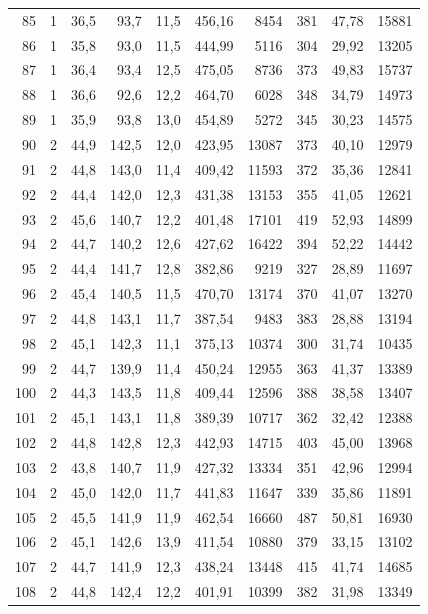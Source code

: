 \documentclass[11pt,a4paper]{article}
\begin{document}
{\begin{longtable}{r c r r r r r r r r}
85 & 1 & 36,5 & 93,7 & 11,5 & 456,16 & 8454 & 381 & 47,78 & 15881 \\
86 & 1 & 35,8 & 93,0 & 11,5 & 444,99 & 5116 & 304 & 29,92 & 13205 \\
87 & 1 & 36,4 & 93,4 & 12,5 & 475,05 & 8736 & 373 & 49,83 & 15737 \\
88 & 1 & 36,6 & 92,6 & 12,2 & 464,70 & 6028 & 348 & 34,79 & 14973 \\
89 & 1 & 35,9 & 93,8 & 13,0 & 454,89 & 5272 & 345 & 30,23 & 14575 \\
90 & 2 & 44,9 & 142,5 & 12,0 & 423,95 & 13087 & 373 & 40,10 & 12979 \\
91 & 2 & 44,8 & 143,0 & 11,4 & 409,42 & 11593 & 372 & 35,36 & 12841 \\
92 & 2 & 44,4 & 142,0 & 12,3 & 431,38 & 13153 & 355 & 41,05 & 12621 \\
93 & 2 & 45,6 & 140,7 & 12,2 & 401,48 & 17101 & 419 & 52,93 & 14899 \\
94 & 2 & 44,7 & 140,2 & 12,6 & 427,62 & 16422 & 394 & 52,22 & 14442 \\
95 & 2 & 44,4 & 141,7 & 12,8 & 382,86 & 9219 & 327 & 28,89 & 11697 \\
96 & 2 & 45,4 & 140,5 & 11,5 & 470,70 & 13174 & 370 & 41,07 & 13270 \\
97 & 2 & 44,8 & 143,1 & 11,7 & 387,54 & 9483 & 383 & 28,88 & 13194 \\
98 & 2 & 45,1 & 142,3 & 11,1 & 375,13 & 10374 & 300 & 31,74 & 10435 \\
99 & 2 & 44,7 & 139,9 & 11,4 & 450,24 & 12955 & 363 & 41,37 & 13389 \\
100 & 2 & 44,3 & 143,5 & 11,8 & 409,44 & 12596 & 388 & 38,58 & 13407 \\
101 & 2 & 45,1 & 143,1 & 11,8 & 389,39 & 10717 & 362 & 32,42 & 12388 \\
102 & 2 & 44,8 & 142,8 & 12,3 & 442,93 & 14715 & 403 & 45,00 & 13968 \\
103 & 2 & 43,8 & 140,7 & 11,9 & 427,32 & 13334 & 351 & 42,96 & 12994 \\
104 & 2 & 45,0 & 142,0 & 11,7 & 441,83 & 11647 & 339 & 35,86 & 11891 \\
105 & 2 & 45,5 & 141,9 & 11,9 & 462,54 & 16660 & 487 & 50,81 & 16930 \\
106 & 2 & 45,1 & 142,6 & 13,9 & 411,54 & 10880 & 379 & 33,15 & 13102 \\
107 & 2 & 44,7 & 141,9 & 12,3 & 438,24 & 13448 & 415 & 41,74 & 14685 \\
108 & 2 & 44,8 & 142,4 & 12,2 & 401,91 & 10399 & 382 & 31,98 & 13349 \\

\end{longtable}}
\end{document}
